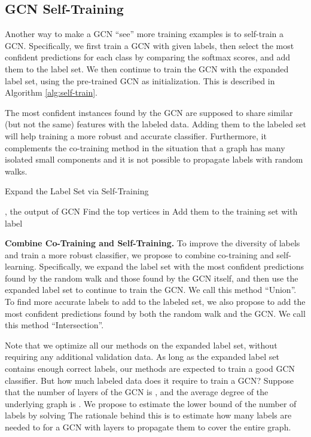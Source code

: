 \documentclass[letterpaper]{article} \usepackage{aaai18}  \usepackage{times}  \usepackage{helvet}  \usepackage{courier}  \usepackage{url}  \usepackage{graphicx}  \usepackage{algorithm}
\begin{document}
\subsection{GCN Self-Training}

Another way to make a GCN ``see'' more training examples is to self-train a GCN. Specifically, we first train a GCN with given labels, then select the most confident predictions for each class by comparing the softmax scores, and add them to the label set. We then continue to train the GCN with the expanded label set, using the pre-trained GCN as initialization. This is described in Algorithm \ref{alg:self-train}.



The most confident instances found by the GCN are supposed to share similar (but not the same) features with the labeled data. Adding them to the labeled set will help training a more robust and accurate classifier. Furthermore, it complements the co-training method in the situation that a graph has many isolated small components and it is not possible to propagate labels with random walks.

\begin{algorithm}
    \caption{Expand the Label Set via Self-Training}\label{alg:self-train}
    \label{parwalk}
    \begin{algorithmic}[1]
    \STATE , the output of GCN
    \STATE Find the top  vertices in 
\STATE Add them to the training set with label 
\ENDFOR
    \end{algorithmic}
\end{algorithm}





\textbf{Combine Co-Training and Self-Training.} To improve the diversity of labels and train a more robust classifier, we propose to combine co-training and self-learning. Specifically, we expand the label set with the most confident predictions found by the random walk and those found by the GCN itself, and then use the expanded label set to continue to train the GCN. We call this method ``Union''. To find more accurate labels to add to the labeled set, we also propose to add the most confident predictions found by both the random walk and the GCN. We call this method ``Intersection''.



Note that we optimize all our methods on the expanded label set, without requiring any additional validation data. As long as the expanded label set contains enough correct labels, our methods are expected to train a good GCN classifier. But how much labeled data does it require to train a GCN? Suppose that the number of layers of the GCN is , and the average degree of the underlying graph is . We propose to estimate the lower bound of the number of labels  by solving   The rationale behind this is to estimate how many labels are needed to for a GCN with  layers to propagate them to cover the entire graph.
\end{document}
